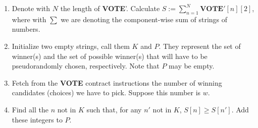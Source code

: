 \documentclass[submission, copyright,creativecommons,sharealike,noncommercial]{eptcs}
\newcommand{\Vote}{\textbf{VOTE}\xspace}
\begin{document}
	\begin{enumerate}
		\item Denote with $N$ the length of \Vote'. Calculate $S := \sum_{n=1}^N \Vote'[n][2]$, where with $\sum$ we are denoting the component-wise sum of strings of numbers.
		
		\item Initialize two empty strings, call them $K$ and $P$. They represent the set of winner(s) and the set of possible winner(s) that will have to be pseudorandomly chosen, respectively. Note that $P$ may be empty.
		
		\item Fetch from the \Vote contract instructions the number of winning candidates (choices) we have to pick. Suppose this number is $w$.
		
		\item Find all the $n$ not in $K$ such that, for any $n'$ not in $K$, $S[n] \geq S[n']$. Add these integers to $P$.
		

\end{enumerate}
\end{document}
